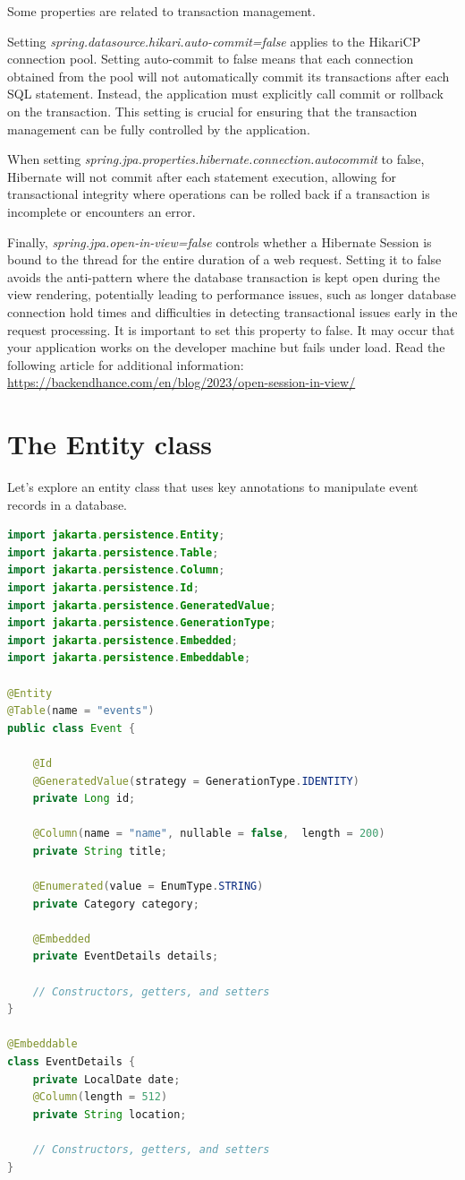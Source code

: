 Some properties are related to transaction management. 

Setting \textit{spring.datasource.hikari.auto-commit=false} applies to the HikariCP connection pool. Setting auto-commit to false means that each connection obtained from the pool will not automatically commit its transactions after each SQL statement. Instead, the application must explicitly call commit or rollback on the transaction. This setting is crucial for ensuring that the transaction management can be fully controlled by the application.

When setting \textit{spring.jpa.properties.hibernate.connection.autocommit} to false, Hibernate will not commit after each statement execution, allowing for transactional integrity where operations can be rolled back if a transaction is incomplete or encounters an error.

Finally, \textit{spring.jpa.open-in-view=false} controls whether a Hibernate Session is bound to the thread for the entire duration of a web request. Setting it to false avoids the anti-pattern where the database transaction is kept open during the view rendering, potentially leading to performance issues, such as longer database connection hold times and difficulties in detecting transactional issues early in the request processing. It is important to set this property to false. It may occur that your application works on the developer machine but fails under load.
Read the following article for additional information:
\url{https://backendhance.com/en/blog/2023/open-session-in-view/}


\section{The Entity class}

Let's explore an entity class that uses key annotations to manipulate event records in a database.

\begin{lstlisting}[frame=single,language=java]
import jakarta.persistence.Entity;
import jakarta.persistence.Table;
import jakarta.persistence.Column;
import jakarta.persistence.Id;
import jakarta.persistence.GeneratedValue;
import jakarta.persistence.GenerationType;
import jakarta.persistence.Embedded;
import jakarta.persistence.Embeddable;

@Entity
@Table(name = "events")
public class Event {

    @Id
    @GeneratedValue(strategy = GenerationType.IDENTITY)
    private Long id;

    @Column(name = "name", nullable = false,  length = 200)
    private String title;
    
    @Enumerated(value = EnumType.STRING)
    private Category category;

    @Embedded
    private EventDetails details;

    // Constructors, getters, and setters
}

@Embeddable
class EventDetails {
    private LocalDate date;
    @Column(length = 512)
    private String location;

    // Constructors, getters, and setters
}
\end{lstlisting}

